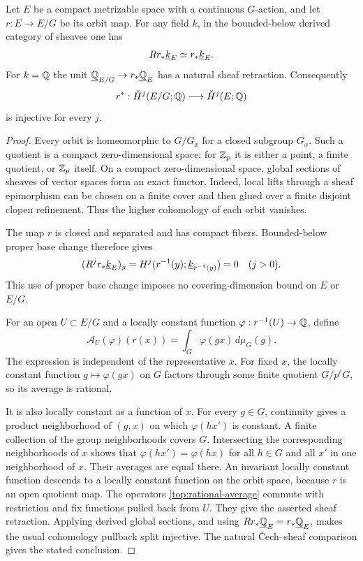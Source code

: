 \begin{lemma}
\label{lem:orbit-injectivity}
Let $E$ be a compact metrizable space with a continuous $G$-action,
and let $r:E\to E/G$ be its orbit map.  For any field $k$, in the
bounded-below derived category of sheaves one has
\[
 Rr_*\underline{k}_{E}\simeq r_*\underline{k}_{E}.
\]
For $k=\mathbb Q$ the unit
$\underline{\mathbb Q}_{E/G}\to r_*\underline{\mathbb Q}_{E}$ has a natural sheaf
retraction.  Consequently
\[
 r^*:\check H^j(E/G;\mathbb Q)\longrightarrow\check H^j(E;\mathbb Q)
\]
is injective for every $j$.
\end{lemma}

\begin{proof}
Every orbit is homeomorphic to $G/G_x$ for a closed subgroup $G_x$.
Such a quotient is a compact zero-dimensional space: for $\mathbb Z_p$ it
is either a point, a finite quotient, or $\mathbb Z_p$ itself.  On a compact
zero-dimensional space, global sections of sheaves of vector
spaces form an exact functor.  Indeed, local lifts through a sheaf
epimorphism can be chosen on a finite cover and then glued over a
finite disjoint clopen refinement.  Thus the higher cohomology of
each orbit vanishes.

The map $r$ is closed and separated and has compact fibers.
Bounded-below proper base change
\cite[Lemma~20.18.1 and Theorem~20.18.2]{StacksProperBaseChange}
therefore gives
\[
 (R^jr_*\underline{k}_{E})_y
   =H^j(r^{-1}(y);\underline{k}_{r^{-1}(y)})=0
   \quad(j>0).
\]
This use of proper base change imposes no covering-dimension bound
on $E$ or $E/G$.

For an open $U\subset E/G$ and a locally constant function
$\varphi:r^{-1}(U)\to\mathbb Q$, define
\begin{equation}
 \mathcal A_U(\varphi)(r(x))
     =\int_G\varphi(gx)\,d\mu_G(g).
 \label{top:rational-average}
\end{equation}
The expression is independent of the representative $x$.  For
fixed $x$, the locally constant function $g\mapsto\varphi(gx)$ on
$G$ factors through some finite quotient $G/p^\ell G$, so its average
is rational.

It is also locally constant as a function of $x$.  For every
$g\in G$, continuity gives a product neighborhood of $(g,x)$ on
which $\varphi(hx')$ is constant.  A finite collection of the group
neighborhoods covers $G$.  Intersecting the corresponding
neighborhoods of $x$ shows that
$\varphi(hx')=\varphi(hx)$ for all $h\in G$ and all $x'$ in one
neighborhood of $x$.  Their averages are equal there.  An invariant
locally constant function descends to a locally constant function
on the orbit space, because $r$ is an open quotient map.
The operators \eqref{top:rational-average} commute with
restriction and fix functions pulled back from $U$.  They give
the asserted sheaf retraction.  Applying derived global sections,
and using $Rr_*\underline{\mathbb Q}_{E}=r_*\underline{\mathbb Q}_{E}$, makes the usual
cohomology pullback split injective.  The natural \v Cech--sheaf
comparison gives the stated conclusion.
\end{proof}


